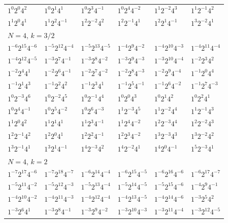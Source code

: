 \documentclass[12pt]{amsart}
\numberwithin{equation}{section}
\theoremstyle{plain}
\theoremstyle{definition}
\theoremstyle{remark}
\begin{document}
\begin{longtable}{llllll}
$1^{0}2^{0}4^{2}$ & $1^{0}2^{1}4^{1}$ & $1^{0}2^{3}4^{-1}$ & $1^{0}2^{4}4^{-2}$ & $1^{1}2^{-2}4^{3}$ & $1^{1}2^{-1}4^{2}$\\
$1^{1}2^{0}4^{1}$ & $1^{1}2^{2}4^{-1}$ & $1^{2}2^{-2}4^{2}$ & $1^{2}2^{-1}4^{1}$ & $1^{2}2^{1}4^{-1}$ & $1^{3}2^{-2}4^{1}$\\
\midrule
\multicolumn{6}{l}{$N=4$, $k=3/2$}\\
$1^{-6}2^{15}4^{-6}$ & $1^{-5}2^{12}4^{-4}$ & $1^{-5}2^{13}4^{-5}$ & $1^{-4}2^{9}4^{-2}$ & $1^{-4}2^{10}4^{-3}$ & $1^{-4}2^{11}4^{-4}$\\
$1^{-4}2^{12}4^{-5}$ & $1^{-3}2^{7}4^{-1}$ & $1^{-3}2^{8}4^{-2}$ & $1^{-3}2^{9}4^{-3}$ & $1^{-3}2^{10}4^{-4}$ & $1^{-2}2^{3}4^{2}$\\
$1^{-2}2^{4}4^{1}$ & $1^{-2}2^{6}4^{-1}$ & $1^{-2}2^{7}4^{-2}$ & $1^{-2}2^{8}4^{-3}$ & $1^{-2}2^{9}4^{-4}$ & $1^{-1}2^{0}4^{4}$\\
$1^{-1}2^{1}4^{3}$ & $1^{-1}2^{2}4^{2}$ & $1^{-1}2^{3}4^{1}$ & $1^{-1}2^{5}4^{-1}$ & $1^{-1}2^{6}4^{-2}$ & $1^{-1}2^{7}4^{-3}$\\
$1^{0}2^{-3}4^{6}$ & $1^{0}2^{-2}4^{5}$ & $1^{0}2^{-1}4^{4}$ & $1^{0}2^{0}4^{3}$ & $1^{0}2^{1}4^{2}$ & $1^{0}2^{2}4^{1}$\\
$1^{0}2^{4}4^{-1}$ & $1^{0}2^{5}4^{-2}$ & $1^{0}2^{6}4^{-3}$ & $1^{1}2^{-3}4^{5}$ & $1^{1}2^{-2}4^{4}$ & $1^{1}2^{-1}4^{3}$\\
$1^{1}2^{0}4^{2}$ & $1^{1}2^{1}4^{1}$ & $1^{1}2^{3}4^{-1}$ & $1^{1}2^{4}4^{-2}$ & $1^{2}2^{-3}4^{4}$ & $1^{2}2^{-2}4^{3}$\\
$1^{2}2^{-1}4^{2}$ & $1^{2}2^{0}4^{1}$ & $1^{2}2^{2}4^{-1}$ & $1^{2}2^{3}4^{-2}$ & $1^{3}2^{-3}4^{3}$ & $1^{3}2^{-2}4^{2}$\\
$1^{3}2^{-1}4^{1}$ & $1^{3}2^{1}4^{-1}$ & $1^{4}2^{-3}4^{2}$ & $1^{4}2^{-2}4^{1}$ & $1^{4}2^{0}4^{-1}$ & $1^{5}2^{-3}4^{1}$\\
\midrule
\multicolumn{6}{l}{$N=4$, $k=2$}\\
$1^{-7}2^{17}4^{-6}$ & $1^{-7}2^{18}4^{-7}$ & $1^{-6}2^{14}4^{-4}$ & $1^{-6}2^{15}4^{-5}$ & $1^{-6}2^{16}4^{-6}$ & $1^{-6}2^{17}4^{-7}$\\
$1^{-5}2^{11}4^{-2}$ & $1^{-5}2^{12}4^{-3}$ & $1^{-5}2^{13}4^{-4}$ & $1^{-5}2^{14}4^{-5}$ & $1^{-5}2^{15}4^{-6}$ & $1^{-4}2^{9}4^{-1}$\\
$1^{-4}2^{10}4^{-2}$ & $1^{-4}2^{11}4^{-3}$ & $1^{-4}2^{12}4^{-4}$ & $1^{-4}2^{13}4^{-5}$ & $1^{-4}2^{14}4^{-6}$ & $1^{-3}2^{5}4^{2}$\\
$1^{-3}2^{6}4^{1}$ & $1^{-3}2^{8}4^{-1}$ & $1^{-3}2^{9}4^{-2}$ & $1^{-3}2^{10}4^{-3}$ & $1^{-3}2^{11}4^{-4}$ & $1^{-3}2^{12}4^{-5}$\\

\end{longtable}
\end{document}
